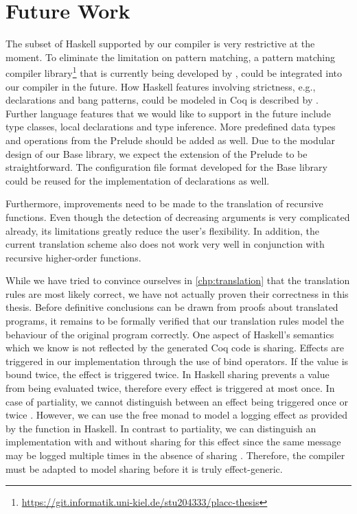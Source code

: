 \section{Future Work} \label{sec:conclusion:future-work}

The subset of Haskell supported by our compiler is very restrictive at the moment.
To eliminate the limitation on pattern matching, a pattern matching compiler library\footnote{\url{https://git.informatik.uni-kiel.de/stu204333/placc-thesis}} that is currently being developed by , could be integrated into our compiler in the future.
How Haskell features involving strictness, e.g.,  declarations and bang patterns, could be modeled in Coq is described by \citet[pp.~132-134]{Christiansen:2019}.
Further language features that we would like to support in the future include type classes, local declarations and type inference.
More predefined data types and operations from the Prelude should be added as well.
Due to the modular design of our Base library, we expect the extension of the Prelude to be straightforward.
The configuration file format developed for the Base library could be reused for the implementation of  declarations as well.

Furthermore, improvements need to be made to the translation of recursive functions.
Even though the detection of decreasing arguments is very complicated already, its limitations greatly reduce the user's flexibility.
In addition, the current translation scheme also does not work very well in conjunction with recursive higher-order functions.

While we have tried to convince ourselves in \autoref{chp:translation} that the translation rules are most likely correct, we have not actually proven their correctness in this thesis.
Before definitive conclusions can be drawn from proofs about translated programs, it remains to be formally verified that our translation rules model the behaviour of the original program correctly.
One aspect of Haskell's semantics which we know is not reflected by the generated Coq code is sharing.
Effects are triggered in our implementation through the use of bind operators.
If the value is bound twice, the effect is triggered twice.
In Haskell sharing prevents a value from being evaluated twice, therefore every effect is triggered at most once.
In case of partiality, we cannot distinguish between an effect being triggered once or twice \cite[p.~131]{Christiansen:2019}.
However, we can use the free monad to model a logging effect as provided by the function  in Haskell.
In contrast to partiality, we can distinguish an implementation with and without sharing for this effect since the same message may be logged multiple times in the absence of sharing \cite[p.~131]{Christiansen:2019}.
Therefore, the compiler must be adapted to model sharing before it is truly effect-generic.

